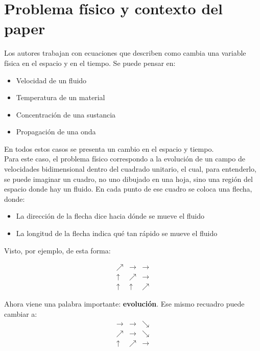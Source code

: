 \documentclass[10pt,letterpaper,twocolumn]{article}
\begin{document}
\section{Problema físico y contexto del paper}

Los autores trabajan con ecuaciones que describen como cambia una variable física en el espacio y en el tiempo. Se puede pensar en:

\begin{itemize}
    \item Velocidad de un fluido
    \item Temperatura de un material
    \item Concentración de una sustancia
    \item Propagación de una onda
\end{itemize}

En todos estos casos se presenta un cambio en el espacio y tiempo.
\\
Para este caso, el problema físico correspondo a la evolución de un campo de velocidades bidimensional dentro del cuadrado unitario, el cual, para entenderlo, se puede imaginar un cuadro, no uno dibujado en una hoja, sino una región del espacio donde hay un fluido. En cada punto de ese cuadro se coloca una flecha, donde:

\begin{itemize}[leftmargin=*]
    \item La dirección de la flecha dice hacia dónde se mueve el fluido
    \item La longitud de la flecha indica qué tan rápido se mueve el fluido
\end{itemize}

Visto, por ejemplo, de esta forma:

\[
\begin{matrix}
\nearrow & \rightarrow & \rightarrow \\
\uparrow & \nearrow & \rightarrow \\
\uparrow & \uparrow & \nearrow
\end{matrix}
\]

Ahora viene una palabra importante: \textbf{evolución}. Ese mismo recuadro puede cambiar a:
\[
\begin{matrix}
\rightarrow & \rightarrow & \searrow \\
\nearrow & \rightarrow & \searrow \\
\uparrow & \nearrow & \rightarrow
\end{matrix}
\]
\end{document}
